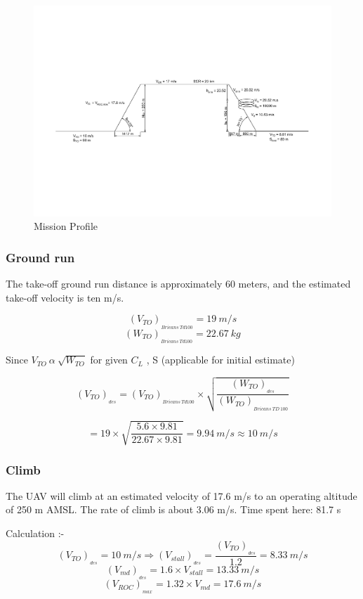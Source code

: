 \documentclass[12 pt]{article}
\begin{document}
\begin{figure}[h]
    \centering
    \includegraphics[width = \linewidth]{Drawing1-Model_final.pdf}
    \caption{Mission Profile}
    \label{Mission Profile}
\end{figure}


\subsubsection{Ground run}
The take-off ground run distance is approximately 60 meters, and the estimated take-off velocity is ten m/s. \cite{EgglestonUnknownTitle2015}

$$ (V_{TO})_{_{Bricans \: Td100}} = 19 \: m/s$$
$$ (W_{TO})_{_{Bricans \: Td100}} = 22.67 \: kg$$

Since $ V_{TO} \: \alpha \: \sqrt{W_{TO}} $ for given $C_L$ , S (applicable for initial estimate)

$$ (V_{TO})_{_{des}} = (V_{TO})_{_{Bricans \: Td100}} \times \sqrt{\frac{(W_{TO})_{_{des}}}{(W_{TO})_{_{Bricans \: TD \: 100}}}} $$

$$ = 19 \times \sqrt{\frac{5.6 \times 9.81}{22.67 \times 9.81}} = 9.94 \: m/s \approx 10 \: m/s $$

\subsubsection{Climb \cite{1000_questions} }
The UAV will climb at an estimated velocity of 17.6 m/s to an operating altitude of 250 m AMSL. The rate of climb is about 3.06 m/s. Time spent here: 81.7 s

Calculation :- 
$$ (V_{TO})_{_{des}} = 10 \: m/s \Rightarrow (V_{stall})_{_{des}} = \frac{(V_{TO})_{_{des}}}{1.2} = 8.33 \: m/s $$
$$ (V_{md})_{_{des}} = 1.6 \times V_{stall} = 13.33 \: m/s $$
$$ (V_{ROC})_{_{max}} = 1.32 \times V_{md} = 17.6 \: m/s $$
\end{document}
